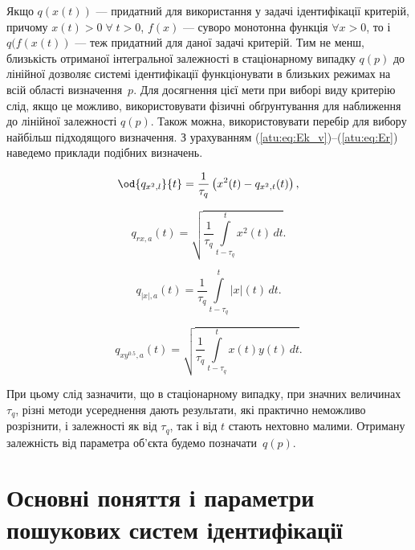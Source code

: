 Якщо
$q(x(t))$ --- придатний для використання у задачі ідентифікації критерій,
причому
$ x (t)> 0 \; \forall \; t> 0 $,
$ f (x) $ --- суворо монотонна функція
$ \forall x > 0 $, то і
$q(f(x(t))$ --- теж придатний для даної задачі критерій. Тим
не менш, близькість отриманої інтегральної залежності в
стаціонарному випадку
$q(p)$ до лінійної дозволяє системі ідентифікації функціонувати
в близьких режимах на всій області визначення~$p$.
Для досягнення цієї мети при виборі виду критерію слід, якщо
це можливо, використовувати фізичні обґрунтування для наближення
до лінійної залежності $q(p)$.
Також можна, використовувати перебір для вибору найбільш
підходящого визначення. З урахуванням (\ref{atu:eq:Ek_v})--(\ref{atu:eq:Er})
наведемо приклади подібних визначень.


\begin{equation}
\od{q_{x^2,l}}{t}
=
\frac{1}{\tau_q} \left( x^2(t) - q_{x^2,t}(t) \right)
,
\label{atu:eq:qx2l}
\end{equation}

\begin{equation}
  q_{rx,a}(t) =
  \sqrt{
    \frac{1}{\tau_q}
    \int\limits_{t-\tau_q}^{t} x^2(t) \, dt
  }.
  \label{atu:eq:qrxa}
\end{equation}

\begin{equation}
  q_{|x|,a}(t) =
  \frac{1}{\tau_q}
  \int\limits_{t-\tau_q}^{t} |x|(t) \, dt
  .
  \label{atu:eq:qxma}
\end{equation}

\begin{equation}
  q_{xy^{0.5},a}(t) =
  \sqrt{
    \frac{1}{\tau_q}
    \int\limits_{t-\tau_q}^{t} x(t)y(t) \, dt
  }
  .
  \label{atu:eq:qxy05a}
\end{equation}

При цьому слід зазначити, що в стаціонарному випадку, при значних
величинах
$ \tau_q $, різні методи усереднення дають результати, які практично неможливо
розрізнити, і залежності як від
$ \tau_q $, так і від
$ t $ стають нехтовно малими. Отриману залежність від
параметра об'єкта будемо позначати~$q(p)$\label{atu:d:q_p}.





\section{Основні поняття і параметри пошукових систем ідентифікації}%

